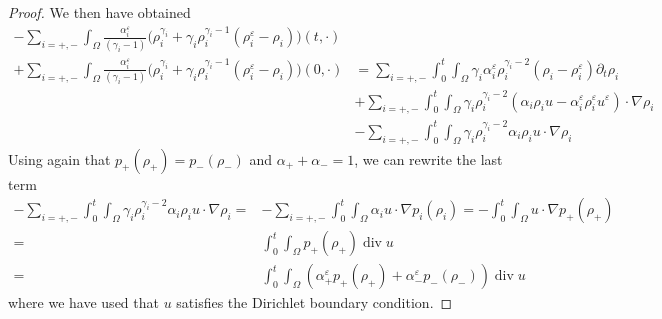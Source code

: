 \documentclass[11pt, twoside, a4paper]{article}
\theoremstyle{plain}
\theoremstyle{remark}
\numberwithin{equation}{section}
\renewcommand{\div}{\operatorname{div}}
\renewcommand{\epsilon}{\varepsilon}
\newcommand{\eps}{\varepsilon}
\begin{document}
\begin{appendices}
\begin{proof}
We then have obtained
\begin{align*}
 -\sum_{i=+,-} \int_{\Omega} \frac{\alpha_i^{\epsilon}}{(\gamma_i -1)} \Big(\rho_i^{\gamma_i} + \gamma_i \rho_i^{\gamma_i-1}(\rho_i^{\epsilon}-\rho_i) \Big)(t,\cdot)&\\ 
 +\sum_{i=+,-} \int_{\Omega} \frac{\alpha_i^{\epsilon}}{(\gamma_i -1)} \Big(\rho_i^{\gamma_i} + \gamma_i \rho_i^{\gamma_i-1}(\rho_i^{\epsilon}-\rho_i) \Big)(0,\cdot)
 &=
 \sum_{i=+,-} \int_0^t\!\!\! \int_{\Omega} \gamma_i \alpha_i^{\epsilon} \rho_i^{\gamma_i-2}(\rho_i - \rho_i^{\epsilon})\partial_t \rho_i \\
 &+ \sum_{i=+,-} \int_0^t\!\!\!\int_{\Omega} \gamma_i \rho_i^{\gamma_i-2} (\alpha_i\rho_i u-\alpha_i^{\epsilon} \rho_i^{\epsilon} u^{\epsilon}) \cdot \nabla\rho_i \\
 &- \sum_{i=+,-} \int_0^t\!\!\!\int_{\Omega} \gamma_i \rho_i^{\gamma_i-2} \alpha_i\rho_i u \cdot \nabla\rho_i
\end{align*}
Using again that $p_+(\rho_+) = p_-(\rho_-)$ and $\alpha_++\alpha_-=1$, we can rewrite the last term
\begin{align*}
 - \sum_{i=+,-} \int_0^t\!\!\!\int_{\Omega} \gamma_i \rho_i^{\gamma_i-2} \alpha_i\rho_i u \cdot \nabla\rho_i
 =&- \sum_{i=+,-} \int_0^t\!\!\!\int_{\Omega} \alpha_i u \cdot \nabla p_i(\rho_i) 
 = -\int_0^t\!\!\!\int_{\Omega} u \cdot \nabla p_+(\rho_+)\\
 =& \int_0^t\!\!\!\int_{\Omega} p_+(\rho_+)\div u \\
 =& \int_0^t\!\!\!\int_{\Omega} (\alpha_+^\eps p_+(\rho_+)+\alpha_-^\eps p_-(\rho_-)) \div u
\end{align*}
where we have used that $u$ satisfies the Dirichlet boundary condition.



\end{proof}
\end{appendices}
\end{document}
